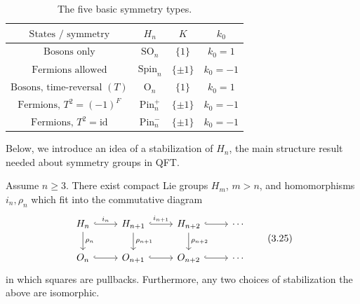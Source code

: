 \documentclass[a4paper,11pt]{article}
\begin{document}
\vspace{0.2cm}

\begin{table}[h]
    \centering
    \begin{tabular}{c|c|c|c}
        $\text{States / symmetry}$ & $H_n$ & $K$ & $k_0$ \\ \hline
        $\text{Bosons only}$
            & $\mathrm{SO}_n$
            & $\{1\}$ & $k_0=1$ \\[2mm]
        $\text{Fermions allowed}$
            & $\mathrm{Spin}_n$
            & $\{\pm1\}$ & $k_0=-1$ \\[2mm]
        $\text{Bosons, time-reversal }(T)$
            & $\mathrm{O}_n$
            & $\{1\}$ & $k_0=1$ \\[2mm]
        $\text{Fermions, }T^2=(-1)^F$
            & $\mathrm{Pin}_n^+$
            & $\{\pm1\}$ & $k_0=-1$ \\[2mm]
        $\text{Fermions, }T^2=\mathrm{id}$
            & $\mathrm{Pin}_n^-$
            & $\{\pm1\}$ & $k_0=-1$
    \end{tabular}
    \caption{The five basic symmetry types.}
    \label{tab:symmetry-types}
\end{table}


Below, we introduce an idea of a stabilization of $H_n$, the main structure result needed about symmetry groups in QFT.



\begin{theorem}[Theorem 3.24]
Assume $n \geq 3$. There exist compact Lie groups $H_m$, $m > n$, and
homomorphisms $i_n,\rho_n$ which fit into the commutative diagram
\[
\begin{tikzcd}
H_n \arrow[r, hook, "i_n"] \arrow[d, "\rho_n"] &
H_{n+1} \arrow[r, hook, "i_{n+1}"] \arrow[d, "\rho_{n+1}"] &
H_{n+2} \arrow[r, hook] \arrow[d, "\rho_{n+2}"] &
\cdots \\
O_n \arrow[r, hook] &
O_{n+1} \arrow[r, hook]  &
O_{n+2} \arrow[r, hook] &
\cdots
\end{tikzcd}
\tag{3.25}
\]
in which squares are pullbacks. Furthermore, any two choices of stabilization the above are isomorphic.
\end{theorem}
\end{document}

